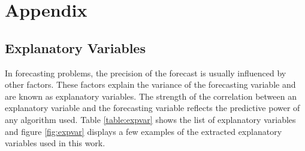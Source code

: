 \documentclass{article}
\begin{document}
\newpage

% 
\printbibliography[segment=0]

\clearpage
\appendix
\newrefsegment %
\section{Appendix}

\subsection{Explanatory Variables}
\label{appx:expvar}
In forecasting problems, the precision of the forecast is usually influenced by other factors. These factors explain the variance of the forecasting variable and are known as explanatory variables. The strength of the correlation between an explanatory variable and the forecasting variable reflects the predictive power of any algorithm used. 
Table \ref{table:expvar} shows the list of explanatory variables and figure \ref{fig:expvar} displays a few examples of the extracted explanatory variables used in this work.
\end{document}
